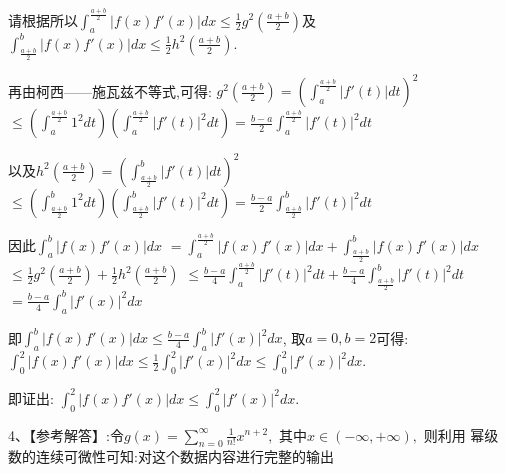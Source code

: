 请根据所以$\int_a^{\frac{a+b}{2}} |f(x)f'(x)|dx \le \frac{1}{2}g^2\left(\frac{a+b}{2}\right)$及
$\int_{\frac{a+b}{2}}^b |f(x)f'(x)|dx \le \frac{1}{2}h^2\left(\frac{a+b}{2}\right).$

再由柯西——施瓦兹不等式,可得:
$g^2\left(\frac{a+b}{2}\right) = \left(\int_a^{\frac{a+b}{2}} |f'(t)|dt\right)^2$
$\le \left(\int_a^{\frac{a+b}{2}} 1^2 dt\right)\left(\int_a^{\frac{a+b}{2}} |f'(t)|^2 dt\right) = \frac{b-a}{2}\int_a^{\frac{a+b}{2}} |f'(t)|^2 dt$

以及$h^2\left(\frac{a+b}{2}\right) = \left(\int_{\frac{a+b}{2}}^b |f'(t)|dt\right)^2$
$\le \left(\int_{\frac{a+b}{2}}^b 1^2 dt\right)\left(\int_{\frac{a+b}{2}}^b |f'(t)|^2 dt\right) = \frac{b-a}{2}\int_{\frac{a+b}{2}}^b |f'(t)|^2 dt$

因此$\int_a^b |f(x)f'(x)|dx$
$= \int_a^{\frac{a+b}{2}} |f(x)f'(x)|dx + \int_{\frac{a+b}{2}}^b |f(x)f'(x)|dx$
$\le \frac{1}{2}g^2\left(\frac{a+b}{2}\right) + \frac{1}{2}h^2\left(\frac{a+b}{2}\right)$
$\le \frac{b-a}{4}\int_a^{\frac{a+b}{2}} |f'(t)|^2 dt + \frac{b-a}{4}\int_{\frac{a+b}{2}}^b |f'(t)|^2 dt$
$= \frac{b-a}{4}\int_a^b |f'(x)|^2 dx$

即$\int_a^b |f(x)f'(x)|dx \le \frac{b-a}{4}\int_a^b |f'(x)|^2 dx$, 取$a = 0, b = 2$可得:
$\int_0^2 |f(x)f'(x)|dx \le \frac{1}{2}\int_0^2 |f'(x)|^2 dx \le \int_0^2 |f'(x)|^2 dx.$

即证出: $\int_0^2 |f(x)f'(x)|dx \le \int_0^2 |f'(x)|^2 dx.$

4、【参考解答】:令$g(x) = \sum_{n=0}^\infty \frac{1}{n!}x^{n+2},$ 其中$x \in (-\infty,+\infty),$ 则利用
幂级数的连续可微性可知:对这个数据内容进行完整的输出